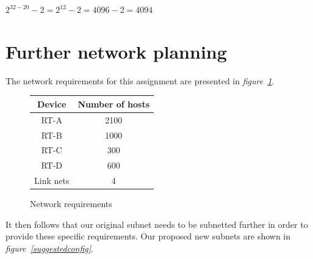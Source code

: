 \documentclass[a4paper, titlepage,12pt]{article}
\begin{document}
		\begin{center}
			$2^{32-20} - 2 = 2^{12} - 2 = 4096 - 2 = 4094$\\
		\end{center}

	\section{Further network planning}

		The network requirements for this assignment are presented in \textit{figure~\ref{netreq}}.

		\begin{figure}[h!]
			\begin{center}
				\begin{tabular}{|c|c|}
					\hline
					\textbf{Device} & \textbf{Number of hosts} \\
					\hline
					RT-A & 2100 \\
					\hline
					RT-B & 1000 \\
					\hline
					RT-C & 300 \\
					\hline
					RT-D & 600 \\
					\hline
					Link nets & 4 \\
					\hline
				\end{tabular}
				\caption{Network requirements}
				\label{netreq}
			\end{center}
		\end{figure}

		It then follows that our original subnet needs to be subnetted further in order to provide these specific requirements.
		Our proposed new subnets are shown in \textit{figure~\ref{suggestedconfig}}.
\end{document}
